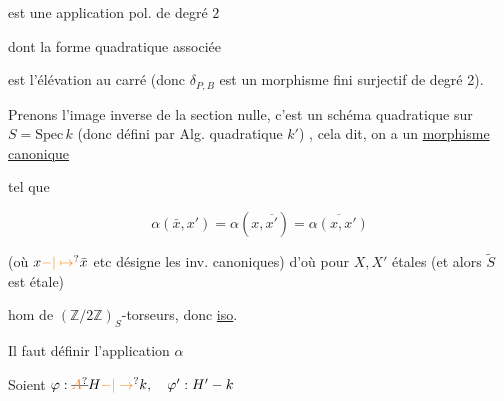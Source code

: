 est une application  pol. de degré $2$


dont la forme quadratique associée


est l'élévation au carré (donc $\delta_{P,B}$
est  un morphisme fini
surjectif de degré 2).

Prenons l'image inverse de la section
nulle, c'est un schéma quadratique
 sur $S=\mathrm{Spec}\,k$ (donc défini par Alg.
quadratique $k'$) , cela dit, on a
un \uline{morphisme canonique}



 tel que

\[
\alpha(\bar x,x')=\alpha(x,\overline{x'})=\overline{\alpha(x,x')}
\]

(où $x\unsure{-|\mapsto}\bar x$ etc désigne les inv. canoniques)
d'où pour $X,X'$ étales (et alors $\widetilde S$ est étale)


 hom de $(\mathbb Z/2\mathbb Z)_S$-torseurs, donc \uline{iso}.

Il faut définir l'application $\alpha$

Soient $\varphi:\deleted{\unsure{A}}H\unsure{-|\to} k,\quad \varphi':H'-k$

